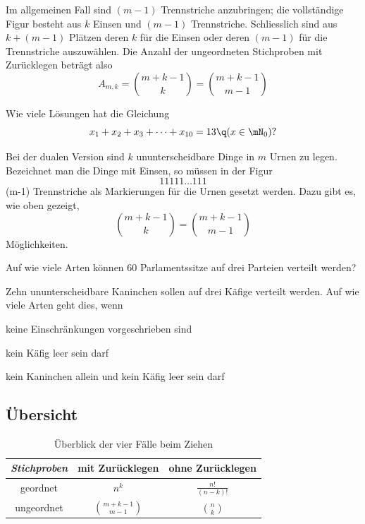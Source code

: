 \documentclass[%
11pt,%
twoside,%
titlepage,%
german,%
headsepline%
]{scrartcl}
\newcommand{\spaltenheight}{\rule{0mm}{3ex}}
\newcommand{\spaltensep}{\\[1ex]}
\begin{document}
Im allgemeinen Fall sind $(m-1)$ Trennstriche anzubringen; die vollständige Figur besteht aus $k$ Einsen und $(m-1)$ Trennstriche. Schliesslich sind aus $k+(m-1)$ Plätzen deren $k$ für die Einsen oder deren $(m-1)$ für die Trennstriche auszuwählen.
Die Anzahl der ungeordneten Stichproben mit Zurücklegen beträgt also
$$A_{m,k}=\binom{m+k-1}{k}=\binom{m+k-1}{m-1}$$

\begin{ueb}
Wie viele Lösungen hat die Gleichung
$$x_1+x_2+x_3+\dots+x_{10}=13\q (x\in\mN_0)?$$
\end{ueb}

Bei der dualen Version sind $k$ ununterscheidbare Dinge in $m$ Urnen zu legen. Bezeichnet man die Dinge mit Einsen, so müssen in der Figur
$$11111\dots111$$
(m-1) Trennstriche als Markierungen für die Urnen gesetzt werden. Dazu gibt es, wie oben gezeigt,
$$\binom{m+k-1}{k}=\binom{m+k-1}{m-1}$$
Möglichkeiten.

\begin{ueb}[Parlamentssitze]
Auf wie viele Arten können 60 Parlamentssitze auf drei Parteien verteilt werden?
\end{ueb}

\begin{ueb}[Kaninchen]
Zehn ununterscheidbare Kaninchen sollen auf drei Käfige verteilt werden. Auf wie viele Arten geht dies, wenn
\begin{enumeratea}
\item keine Einschränkungen vorgeschrieben sind
\item kein Käfig leer sein darf
\item kein Kaninchen allein und kein Käfig leer sein darf
\end{enumeratea}
\end{ueb}

\subsection{Übersicht}

\begin{table}[h]
\scriptsize
\centering
\begin{tabular}{|c|c|c|} \hline
\rowcolor{Gray}\spaltenheight \emph{Stichproben} & mit Zurücklegen & ohne Zurücklegen\spaltensep\hline
\rowcolor{lightyellow}\spaltenheight geordnet & $n^k$ & $\frac{n!}{(n-k)!}$\spaltensep \hline
\rowcolor{Gray}\spaltenheight ungeordnet & $\binom{m+k-1}{m-1}$ & $\binom{n}{k}$\spaltensep \hline
\end{tabular}
\caption{Überblick der vier Fälle beim Ziehen}
\end{table}
\end{document}
